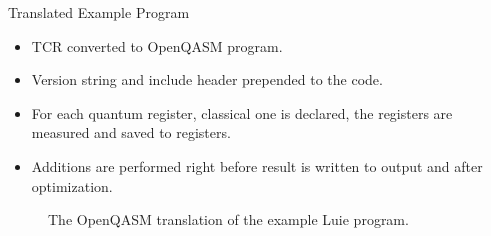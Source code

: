 \begin{frame}{Translated Example Program}    
    \begin{minipage}{.45\textwidth}
        \begin{itemize}
            \item TCR converted to OpenQASM program.
            \item Version string and include header prepended to the code.
            \item For each quantum register, classical one is declared, the registers are measured and saved to registers. 
            \item Additions are performed right before result is written to output and after optimization.
        \end{itemize}
    \end{minipage}
    \hfill
    \begin{minipage}{.50\textwidth}
        \centering
        \vfill
        \begin{figure}
            \centering
            
            \caption{The OpenQASM translation of the example Luie program.}
        \end{figure}
        \vfill
    \end{minipage}
\end{frame}

